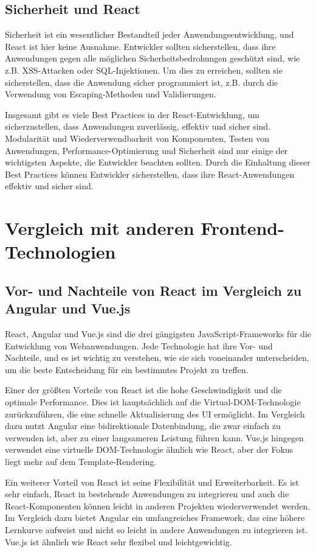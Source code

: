 \subsection{Sicherheit und React}
Sicherheit ist ein wesentlicher Bestandteil jeder Anwendungsentwicklung, und React ist hier keine Ausnahme. Entwickler sollten sicherstellen, dass ihre Anwendungen gegen alle möglichen Sicherheitsbedrohungen geschützt sind, wie z.B. XSS-Attacken oder SQL-Injektionen. Um dies zu erreichen, sollten sie sicherstellen, dass die Anwendung sicher programmiert ist, z.B. durch die Verwendung von Escaping-Methoden und Validierungen.

Insgesamt gibt es viele Best Practices in der React-Entwicklung, um sicherzustellen, dass Anwendungen zuverlässig, effektiv und sicher sind. Modularität und Wiederverwendbarkeit von Komponenten, Testen von Anwendungen, Performance-Optimierung und Sicherheit sind nur einige der wichtigsten Aspekte, die Entwickler beachten sollten. Durch die Einhaltung dieser Best Practices können Entwickler sicherstellen, dass ihre React-Anwendungen effektiv und sicher sind.

\section{Vergleich mit anderen Frontend-Technologien}
\subsection{Vor- und Nachteile von React im Vergleich zu Angular und Vue.js}
React, Angular und Vue.js sind die drei gängigsten JavaScript-Frameworks für die Entwicklung von Webanwendungen. Jede Technologie hat ihre Vor- und Nachteile, und es ist wichtig zu verstehen, wie sie sich voneinander unterscheiden, um die beste Entscheidung für ein bestimmtes Projekt zu treffen.

Einer der größten Vorteile von React ist die hohe Geschwindigkeit und die optimale Performance. Dies ist hauptsächlich auf die Virtual-DOM-Technologie zurückzuführen, die eine schnelle Aktualisierung des UI ermöglicht. Im Vergleich dazu nutzt Angular eine bidirektionale Datenbindung, die zwar einfach zu verwenden ist, aber zu einer langsameren Leistung führen kann. Vue.js hingegen verwendet eine virtuelle DOM-Technologie ähnlich wie React, aber der Fokus liegt mehr auf dem Template-Rendering.

Ein weiterer Vorteil von React ist seine Flexibilität und Erweiterbarkeit. Es ist sehr einfach, React in bestehende Anwendungen zu integrieren und auch die React-Komponenten können leicht in anderen Projekten wiederverwendet werden. Im Vergleich dazu bietet Angular ein umfangreiches Framework, das eine höhere Lernkurve aufweist und nicht so leicht in andere Anwendungen zu integrieren ist. Vue.js ist ähnlich wie React sehr flexibel und leichtgewichtig.


